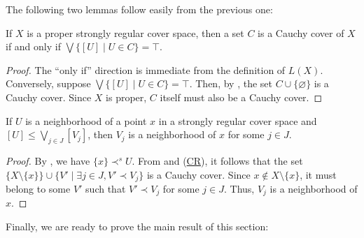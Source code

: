 \documentclass[reqno]{amsart}
\newcommand{\axref}[1]{(\hyperref[ax:#1]{#1})}
\theoremstyle{definition}
\theoremstyle{remark}
\numberwithin{figure}{section}
\newcommand{\rb}{\prec}
\begin{document}
The following two lemmas follow easily from the previous one:

\begin{lem}
If $X$ is a proper strongly regular cover space, then a set $C$ is a Cauchy cover of $X$ if and only if $\bigvee \{ [U] \mid U \in C \} = \top$.
\end{lem}
\begin{proof}
The ``only if'' direction is immediate from the definition of $L(X)$.
Conversely, suppose $\bigvee \{ [U] \mid U \in C \} = \top$.
Then, by , the set $C \cup \{ \varnothing \}$ is a Cauchy cover.
Since $X$ is proper, $C$ itself must also be a Cauchy cover.
\end{proof}

\begin{lem}
If $U$ is a neighborhood of a point $x$ in a strongly regular cover space and $[U] \leq \bigvee_{j \in J} [V_j]$, then $V_j$ is a neighborhood of $x$ for some $j \in J$.
\end{lem}
\begin{proof}
By , we have $\{ x \} \rb^s U$.
From  and \axref{CR}, it follows that the set $\{ X \setminus \{ x \} \} \cup \{ V' \mid \exists j \in J, V' \rb V_j \}$ is a Cauchy cover.
Since $x \notin X \setminus \{ x \}$, it must belong to some $V'$ such that $V' \rb V_j$ for some $j \in J$.
Thus, $V_j$ is a neighborhood of $x$.
\end{proof}

Finally, we are ready to prove the main result of this section:
\end{document}
